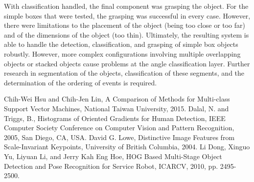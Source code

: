 \documentclass[letterpaper, 10 pt, conference]{conf/ieeeconf}  %
\begin{document}
With classification handled, the final component was grasping the object. For
the simple boxes that were tested, the grasping was successful in every case.
However, there were limitations to the placement of the object (being too close
or too far) and of the dimensions of the object (too thin). Ultimately, the
resulting system is able to handle the detection, classification, and grasping
of simple box objects robustly. However, more complex configurations involving
multiple overlapping objects or stacked objects cause problems at the angle
classification layer. Further research in segmentation of the objects,
classification of these segments, and the determination of the ordering of
events is required.





\addtolength{\textheight}{-12cm}   %




\begin{thebibliography}{99}

 Chih-Wei Hsu and Chih-Jen Lin, A Comparison of Methods for
  Multi-class Support Vector Machines, National Taiwan University, 2015.
 Dalal, N. and Triggs, B., Histograms of Oriented Gradients
  for Human Detection, IEEE Computer Society Conference on Computer Vision and
  Pattern Recognition, 2005, San Diego, CA, USA.
 David G. Lowe, Distinctive Image Features from
  Scale-Invariant Keypoints, University of British Columbia, 2004.
 Li Dong, Xinguo Yu, Liyuan Li, and Jerry Kah Eng Hoe, HOG Based
  Multi-Stage Object Detection and Pose Recognition for Service Robot, ICARCV,
  2010, pp. 2495-2500.
\end{thebibliography}
\end{document}
